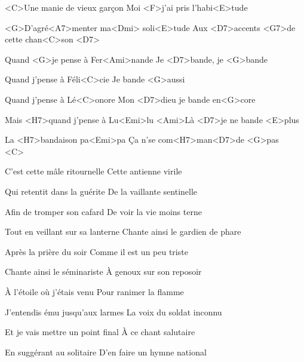 

\zs
<C>Une manie de vieux garçon
Moi <F>j'ai pris l'habi<E>tude

<G>D'agré<A7>menter ma<Dmi> soli<E>tude
Aux <D7>accents <G7>de cette chan<C>son <D7>
\ks

\zr 
Quand <G>je pense à Fer<Ami>nande
Je <D7>bande, je <G>bande

Quand j'pense à Féli<C>cie
Je bande <G>aussi

Quand j'pense à Lé<C>onore
Mon <D7>dieu je bande en<G>core

Mais <H7>quand j'pense à Lu<Emi>lu
<Ami>Là <D7>je ne bande <E>plus

La <H7>bandaison pa<Emi>pa
Ça n'se com<H7>man<D7>de <G>pas ~~~ <C>
\kr

\zs
C'est cette mâle ritournelle
Cette antienne virile

Qui retentit dans la guérite
De la vaillante sentinelle
\ks

\zr \kr

\zs
Afin de tromper son cafard
De voir la vie moins terne

Tout en veillant sur sa lanterne
Chante ainsi le gardien de phare
\ks

\zr \kr

\zs
Après la prière du soir
Comme il est un peu triste

Chante ainsi le séminariste
À genoux sur son reposoir
\ks

\zr \kr

\zs
À l'étoile où j'étais venu
Pour ranimer la flamme

J'entendis ému jusqu'aux larmes
La voix du soldat inconnu
\ks

\zr \kr

\zs
Et je vais mettre un point final
À ce chant salutaire

En suggérant au solitaire
D'en faire un hymne national
\ks

\zr \kr

\kp
